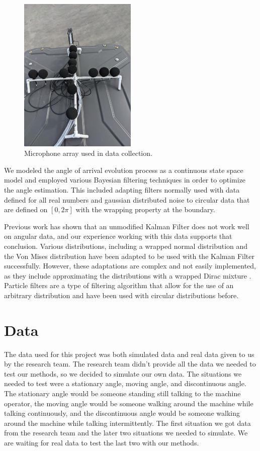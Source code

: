 \documentclass[11pt]{amsart}
\begin{document}
\begin{figure}[htp]
\includegraphics*[width=0.5\textwidth]{Pic of Real Mic Array.jpg}\hfill
\caption{Microphone array used in data collection.}
\label{fig:array}
\end{figure}

We modeled the angle of arrival evolution process as a continuous state space model and employed various Bayesian filtering techniques in order to optimize the angle estimation. This included adapting filters normally used 
with data defined for all real numbers and gaussian distributed noise to circular data that are defined on $[0,2\pi]$ with the wrapping property at the boundary.

Previous work has shown that an unmodified Kalman Filter does not work well on angular data, and our experience working with this data supports that conclusion. 
Various distributions, including a wrapped normal distribution and the Von Mises distribution have been adapted to be used with the Kalman Filter successfully. 
However, these adaptations are complex and not easily implemented, as they include approximating the distributions with a wrapped Dirac mixture \cite{Research}. Particle filters 
are a type of filtering algorithm that allow for the use of an arbitrary distribution and have been used with circular distributions before.



\section{Data}
The data used for this project was both simulated data and real data given to us by the research
team. The research team didn’t provide all the data we needed to test our methods, so we decided to
simulate our own data. The situations we needed to test were a stationary angle, moving angle, and
discontinuous angle. The stationary angle would be someone standing still talking to the machine
operator, the moving angle would be someone walking around the machine while talking continuously,
and the discontinuous angle would be someone walking around the machine while talking
intermittently. The first situation we got data from the research team and the later two situations
we needed to simulate. We are waiting for real data to test the last two with our methods. 
\end{document}
